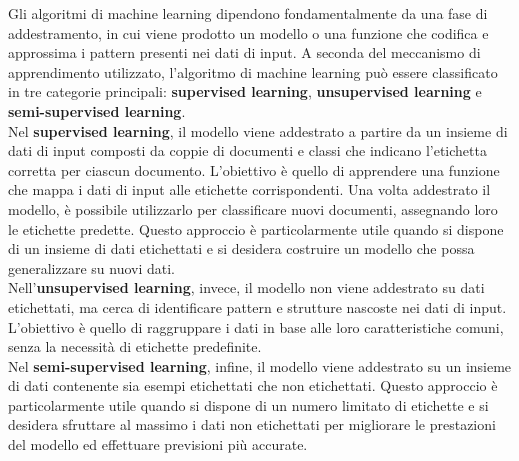 \documentclass{report}
\begin{document}
	Gli algoritmi di machine learning dipendono fondamentalmente da una fase di addestramento, in cui viene prodotto un modello o una funzione che codifica e approssima i pattern presenti nei dati di input. A seconda del meccanismo di apprendimento utilizzato, l'algoritmo di machine learning può essere classificato in tre categorie principali: \textbf{supervised learning}, \textbf{unsupervised learning} e \textbf{semi-supervised learning}.
	\vspace{\baselineskip}\\
	Nel \textbf{supervised learning}, il modello viene addestrato a partire da un insieme di dati di input composti da coppie di documenti e classi che indicano l'etichetta corretta per ciascun documento. L'obiettivo è quello di apprendere una funzione che mappa i dati di input alle etichette corrispondenti. Una volta addestrato il modello, è possibile utilizzarlo per classificare nuovi documenti, assegnando loro le etichette predette. Questo approccio è particolarmente utile quando si dispone di un insieme di dati etichettati e si desidera costruire un modello che possa generalizzare su nuovi dati.
	\vspace{\baselineskip}\\
	Nell'\textbf{unsupervised learning}, invece, il modello non viene addestrato su dati etichettati, ma cerca di identificare pattern e strutture nascoste nei dati di input. L'obiettivo è quello di raggruppare i dati in base alle loro caratteristiche comuni, senza la necessità di etichette predefinite.
	\vspace{\baselineskip}\\
	Nel \textbf{semi-supervised learning}, infine, il modello viene addestrato su un insieme di dati contenente sia esempi etichettati che non etichettati. Questo approccio è particolarmente utile quando si dispone di un numero limitato di etichette e si desidera sfruttare al massimo i dati non etichettati per migliorare le prestazioni del modello ed effettuare previsioni più accurate.
\end{document}
